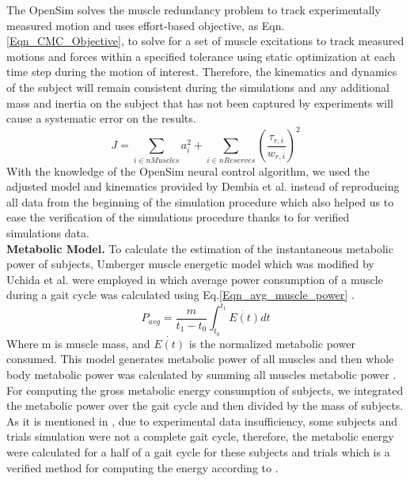 \documentclass[10pt,letterpaper]{article}
\begin{document}
The OpenSim solves the muscle redundancy problem to track experimentally measured motion and uses effort-based objective, as Eqn. \ref{Eqn_CMC_Objective}, to solve for a set of muscle excitations to track measured motions and forces within a specified tolerance using static optimization at each time step during the motion of interest\cite{92}. Therefore, the kinematics and dynamics of the subject will remain consistent during the simulations and any additional mass and inertia on the subject that has not been captured by experiments will cause a systematic error on the results.\\
\begin{equation}\label{Eqn_CMC_Objective}
J = \sum_{i\in nMuscles} a_{i}^{2} + \sum_{i \in nReserves} (\frac{\tau_{r,i}}{w_{r,i}})^2
\end{equation}
With the knowledge of the OpenSim neural control algorithm, we used the adjusted model and kinematics provided by Dembia et al.\cite{93} instead of reproducing all data from the beginning of the simulation procedure which also helped us to ease the verification of the simulations procedure thanks to \cite{93} for verified simulations data.\\
\vspace{5mm}
\textbf{Metabolic Model.} To calculate the estimation of the instantaneous metabolic power of subjects, Umberger \cite{105} muscle energetic model which was modified by Uchida et al. \cite{106}  were employed in which average power consumption of a muscle during a gait cycle was calculated using Eq.\ref{Eqn_avg_muscle_power} \cite{106}.\\
\begin{equation}\label{Eqn_avg_muscle_power}
	P_{avg} = \frac{m}{t_1 - t_0}\int_{t_0}^{t_1} \dot{E(t)} dt
\end{equation}
Where m is muscle mass, and $\dot{E(t)}$ is the normalized metabolic power consumed. This model generates metabolic power of all muscles and then whole body metabolic power was calculated by summing all muscles metabolic power \cite{106}. For computing the gross metabolic energy consumption of subjects, we integrated the metabolic power over the gait cycle and then divided by the mass of subjects.\\
As it is mentioned in \cite{93}, due to experimental data insufficiency, some subjects and trials simulation were not a complete gait cycle, therefore, the metabolic energy were calculated for a half of a gait cycle for these subjects and trials which is a verified method for computing the energy according to \cite{93}. \\
\end{document}
